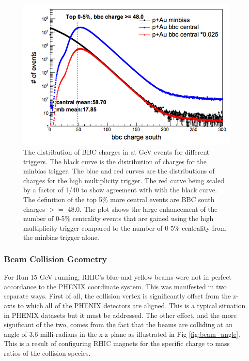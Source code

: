 \begin{figure}[h!]
\begin{center}
\includegraphics[scale=0.55]{figs/pAu_centrality_trigger.png}
\end{center}
\caption{The distribution of BBC charges in \pau at  GeV events for different triggers. The black curve is the distribution of charges for the minbias trigger. The blue and red curves are the distributions of charges for the high multiplicity trigger. The red curve being scaled by a factor of 1/40 to show agreement with with the black curve. The definition of the top 5\% more central events are BBC south charges $>=$ 48.0. The plot shows the large enhancement of the number of 0-5\% centrality events that are gained using the high multiplicity trigger compared to the number of 0-5\% centrality from the minbias trigger alone.}\label{fig:pau_centrality_trig}

\end{figure}

\subsubsection{Beam Collision Geometry}
For Run 15  GeV running, RHIC's blue and yellow beams were not in perfect accordance to the PHENIX coordinate system. This was manifested in two separate ways.
First of all, the collision vertex is significantly offset from the z-axis to which all of the PHENIX detectors are aligned. This is a typical situation in PHENIX datasets but it must be addressed. The other effect, and the more significant of the two, comes from the fact that the beams are colliding at an angle of 3.6 milli-radians in the x-z plane as illustrated in Fig \ref{fig:beam_angle}. This is a result of configuring RHIC magnets for the specific charge to mass ratios of the \pau collision species.

